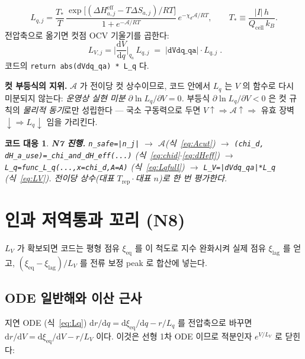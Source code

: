 \documentclass[11pt,a4paper]{article}
\newtheorem*{codebox}{코드 대응}
\newcommand{\dd}{\mathrm{d}}
\newcommand{\eff}{\mathrm{eff}}
\newcommand{\eq}{\mathrm{eq}}
\newcommand{\cell}{\mathrm{cell}}
\newcommand{\rep}{\mathrm{rep}}
\newcommand{\lag}{\mathrm{lag}}
\newcommand{\code}[1]{\texttt{#1}}
\begin{document}
\begin{equation}
L_{q,j}=\frac{T_*}{T}\,\frac{\exp\!\big[(\Delta H_{a,j}^\eff-T\Delta S_{a,j})/RT\big]}{1+e^{-\mathcal A/RT}}
\,e^{-\chi_d\mathcal A/RT},
\qquad T_*\equiv\frac{|I|\,h}{Q_\cell\,k_B}.
\label{eq:Lqfull}
\end{equation}
전압축으로 옮기면 컷점 OCV 기울기를 곱한다:
\begin{equation}
\boxed{\;L_{V,j}=\Big|\frac{\dd V}{\dd q}\Big|_{q_a}\,L_{q,j}\;=\;|\code{dVdq\_qa}|\cdot L_{q,j}\;.}
\label{eq:LV}
\end{equation}
코드의 \code{return abs(dVdq\_qa) * L\_q} 다.

\textbf{컷 부등식의 지위.} $\mathcal A$ 가 전이당 컷 상수이므로, 코드 안에서 $L_q$ 는 $V$ 의 함수로 다시 미분되지 않는다:
\emph{운영상 실현 미분 $\partial\ln L_q/\partial V=0$.} 부등식 $\partial\ln L_q/\partial V<0$ 은 컷 규칙의 \emph{물리적 동기}로만 성립한다 — 국소 구동력으로 두면
$V\!\uparrow\Rightarrow\mathcal A\!\uparrow\Rightarrow$ 유효 장벽$\downarrow\Rightarrow L_q\downarrow$ 임을 가리킨다.

\begin{codebox}
\textbf{N7 진행.} \code{n\_safe=|n\_j|} $\to$ $\mathcal A$(식~\eqref{eq:Acut}) $\to$
\code{(chi\_d, dH\_a\_use)=\_chi\_and\_dH\_eff(...)} (식~\eqref{eq:chid}$\cdot$\eqref{eq:dHeff}) $\to$
\code{L\_q=func\_L\_q(...,x=chi\_d,A=A)} (식~\eqref{eq:Lqfull}) $\to$ \code{L\_V=|dVdq\_qa|*L\_q} (식~\eqref{eq:LV}).
전이당 \emph{상수}(대표 $T_\rep\cdot$대표 $n$)로 한 번 평가한다.
\end{codebox}

\section{인과 저역통과 꼬리 (N8)}\label{sec:tail}
$L_V$ 가 확보되면 코드는 평형 점유 $\xi_\eq$ 를 이 척도로 지수 완화시켜 실제 점유 $\xi_\lag$ 를 얻고,
$(\xi_\eq-\xi_\lag)/L_V$ 를 전류 보정 peak 로 합산에 넣는다.

\subsection{ODE 일반해와 이산 근사}
지연 ODE (식~\eqref{eq:Lq}) $\dd r/\dd q=\dd\xi_\eq/\dd q-r/L_q$ 를 전압축으로 바꾸면
$\dd r/\dd V=\dd\xi_\eq/\dd V-r/L_V$ 이다. 이것은 선형 1차 ODE 이므로 적분인자 $e^{V/L_V}$ 로 닫힌다:
\end{document}
